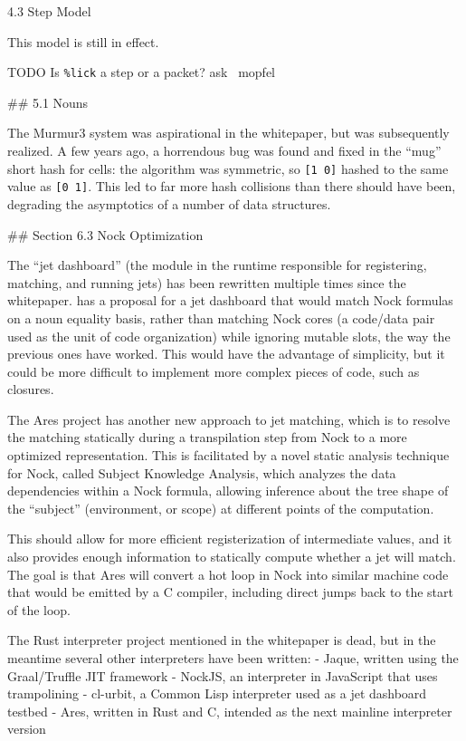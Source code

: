 \documentclass[twoside]{article}
\begin{document}
4.3 Step Model

This model is still in effect.

TODO Is \lstinline[style=inlinecode]{%lick} a step or a packet? ask ~mopfel

## 5.1 Nouns

The Murmur3 system was aspirational in the whitepaper, but was subsequently realized.  A few years ago, a horrendous bug was found and fixed in the ``mug'' short hash for cells:  the algorithm was symmetric, so \lstinline[style=inlinecode]{[1 0]} hashed to the same value as \lstinline[style=inlinecode]{[0 1]}.  This led to far more hash collisions than there should have been, degrading the asymptotics of a number of data structures.

## Section 6.3 Nock Optimization

The ``jet dashboard'' (the module in the runtime responsible for registering, matching, and running jets) has been rewritten multiple times since the whitepaper.   has a proposal for a jet dashboard that would match Nock formulas on a noun equality basis, rather than matching Nock cores (a code/data pair used as the unit of code organization) while ignoring mutable slots, the way the previous ones have worked.  This would have the advantage of simplicity, but it could be more difficult to implement more complex pieces of code, such as closures.

The Ares project has another new approach to jet matching, which is to resolve the matching statically during a transpilation step from Nock to a more optimized representation.  This is facilitated by a novel static analysis technique for Nock, called Subject Knowledge Analysis, which analyzes the data dependencies within a Nock formula, allowing inference about the tree shape of the ``subject'' (environment, or scope) at different points of the computation.

This should allow for more efficient registerization of intermediate values, and it also provides enough information to statically compute whether a jet will match.  The goal is that Ares will convert a hot loop in Nock into similar machine code that would be emitted by a C compiler, including direct jumps back to the start of the loop.

The Rust interpreter project mentioned in the whitepaper is dead, but in the meantime several other interpreters have been written:
- Jaque, written using the Graal/Truffle JIT framework
- NockJS, an interpreter in JavaScript that uses trampolining
- cl-urbit, a Common Lisp interpreter used as a jet dashboard testbed
- Ares, written in Rust and C, intended as the next mainline interpreter version
\end{document}
